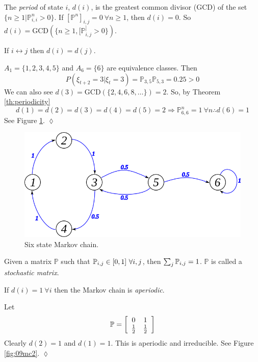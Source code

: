 \begin{definition}
The \textit{period} of state $i$, $d(i)$, is the greatest common divisor (GCD) of the set $\{n\geq1|\mathbb{P}_{i,i}^n>0\}$. If $[\mathbb{P}^n]_{i,j} = 0 ~\forall n\geq1$, then $d(i)=0$. So $d(i) = \text{GCD}(\{n\geq1,[\mathbb{P}^]_{i,j}>0\})$.
\end{definition}

\begin{theorem}
\label{th:periodicity}
If $i\leftrightarrow j$ then $d(i)=d(j)$.
\end{theorem}

\begin{example}
$A_1=\{1,2,3,4,5\}$ and $A_6=\{6\}$ are equivalence classes. Then
$$P(\xi_{t+2}=3|\xi_t=3) = \mathbb{P}_{3,5}\mathbb{P}_{5,3} = 0.25> 0$$
We can also see $d(3)=\text{GCD}(\{2,4,6,8,\ldots\})=2$. So, by Theorem \ref{th:periodicity}
$$d(1)=d(2)=d(3)=d(4)=d(5)=2 \Rightarrow \mathbb{P}_{6,6}^n=1 ~\forall n \therefore d(6)=1$$
See Figure \ref{fig:09mc6}.
$\lozenge$
\end{example}

\begin{figure}[ht!]
	\centering
	\includegraphics[width=.4\textwidth]{images/09mc6}
	\caption{Six state Markov chain.}
	\label{fig:09mc6}
\end{figure}

\begin{definition}
Given a matrix $\mathbb{P}$ such that $\mathbb{P}_{i,j}\in[0,1] ~\forall i,j$, then $\sum_j\mathbb{P}_{i,j}=1$. $\mathbb{P}$ is called a \textit{stochastic matrix}.
\end{definition}

\begin{definition}
If $d(i)=1 ~\forall i$ then the Markov chain is \textit{aperiodic}.
\end{definition}

\begin{example}
Let
$$\mathbb{P} = \left[\begin{array}{c c} 0 & 1 \\ \frac{1}{2} & \frac{1}{2} \end{array}\right]$$
Clearly $d(2)=1$ and $d(1)=1$. This is aperiodic and irreducible. See Figure \ref{fig:09mc2}.
$\lozenge$
\end{example}

